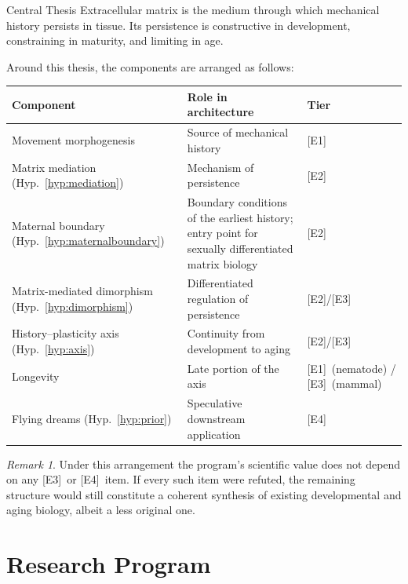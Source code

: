 \documentclass[11pt,a4paper]{article}
\theoremstyle{plain}
\theoremstyle{definition}
\theoremstyle{remark}
\newtheorem{remark}{Remark}[section]
\newcommand{\tier}[1]{\textup{\textsc{[#1]}}}
\newcommand{\Eone}{\tier{E1}}
\newcommand{\Etwo}{\tier{E2}}
\newcommand{\Ethree}{\tier{E3}}
\newcommand{\Efour}{\tier{E4}}
\begin{document}
\begin{statusbox}{Central Thesis}
Extracellular matrix is the medium through which mechanical history persists in tissue. Its persistence is constructive in development, constraining in maturity, and limiting in age.
\end{statusbox}

Around this thesis, the components are arranged as follows:

\begin{center}
\small
\begin{tabularx}{\textwidth}{@{}>{\raggedright\arraybackslash}p{}>{\raggedright\arraybackslash}X>{\raggedright\arraybackslash}p{}@{}}
\toprule
\textbf{Component} & \textbf{Role in architecture} & \textbf{Tier} \\
\midrule
Movement morphogenesis & Source of mechanical history & \Eone \\
Matrix mediation (Hyp.~\ref{hyp:mediation}) & Mechanism of persistence & \Etwo \\
Maternal boundary (Hyp.~\ref{hyp:maternalboundary}) & Boundary conditions of the earliest history; entry point for sexually differentiated matrix biology & \Etwo \\
Matrix-mediated dimorphism (Hyp.~\ref{hyp:dimorphism}) & Differentiated regulation of persistence & \Etwo/\Ethree \\
History--plasticity axis (Hyp.~\ref{hyp:axis}) & Continuity from development to aging & \Etwo/\Ethree \\
Longevity & Late portion of the axis & \Eone\ (nematode) / \Ethree\ (mammal) \\
Flying dreams (Hyp.~\ref{hyp:prior}) & Speculative downstream application & \Efour \\
\bottomrule
\end{tabularx}
\end{center}

\begin{remark}
Under this arrangement the program's scientific value does not depend on any \Ethree\ or \Efour\ item. If every such item were refuted, the remaining structure would still constitute a coherent synthesis of existing developmental and aging biology, albeit a less original one.
\end{remark}

\section{Research Program}\label{sec:program}
\end{document}

